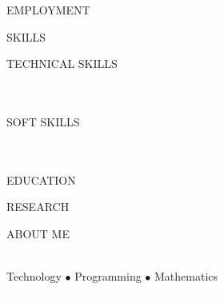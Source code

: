 \documentclass{style_classes/cv_black}
\newcommand{\tc}[2]{\textcolor{#1}{#2}}
\begin{document}
	\begin{multicols}{2}

		\begin{sectionname}
			{EMPLOYMENT}
			{
			
			}
		\end{sectionname}
	

		\begin{listlikeenv}
			{SKILLS}
			{
				\begin{skills}
					{TECHNICAL SKILLS}
					{\tc{white}{Proficient with:}\\
					\\
					\tc{white}{Familiar with:}\\
					}
				\end{skills}

				\begin{firstskills}
					{SOFT SKILLS}
					{\tc{white}{Strong:}\\
					\\
					\tc{white}{Basic knowledge:}\\
					}\end{firstskills}}
		\end{listlikeenv}

		 

		\begin{sectionname}
			{EDUCATION}
			{
		
		}
		\end{sectionname}

		\begin{listlikeenv}
			{RESEARCH}
			{\footnotesize \vspace{-0.5cm}
				\tc{white}{
					
                }
			}
		\end{listlikeenv}
		\begin{listlikeenv}
			{ABOUT ME}
			{   
				\tc{white}{INTERESTS:}\\
				\tc{nicegray}{Technology $\bullet$ Programming $\bullet$ Mathematics}\\
				\tc{white}{ASSOCIATIONS:}
				\tc{nicegray}{
					
					}
			}
		\end{listlikeenv}



\end{multicols}

 
 
 
\end{document}
